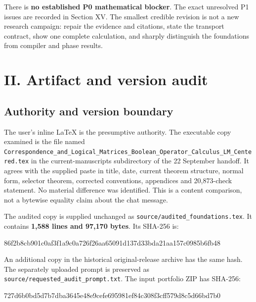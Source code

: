 \documentclass[
  10pt,
]{article}
\newenvironment{Shaded}{}{}
\newcommand{\NormalTok}[1]{#1}
\begin{document}
There is \textbf{no established P0 mathematical blocker}. The exact
unresolved P1 issues are recorded in Section XV. The smallest credible
revision is not a new research campaign: repair the evidence and
citations, state the transport contract, show one complete calculation,
and sharply distinguish the foundations from compiler and phase results.

\section{II. Artifact and version
audit}\label{ii.-artifact-and-version-audit}

\subsection{Authority and version
boundary}\label{authority-and-version-boundary}

The user's inline LaTeX is the presumptive authority. The executable
copy examined is the file named
\texttt{Correspondence\_and\_Logical\_Matrices\_Boolean\_Operator\_Calculus\_LM\_Centered.tex}
in the current-manuscripts subdirectory of the 22 September handoff. It
agrees with the supplied paste in title, date, current theorem
structure, normal form, selector theorem, corrected conventions,
appendices and 20,873-check statement. No material difference was
identified. This is a content comparison, not a bytewise equality claim
about the chat message.

The audited copy is supplied unchanged as
\texttt{source/audited\_foundations.tex}. It contains \textbf{1,588
lines and 97,170 bytes}. Its SHA-256 is:

\begin{Shaded}
\begin{Highlighting}[]
\NormalTok{86f2b8cb901c0af3f1a9c0a726f26aa65091d137d33bda21aa157c0985b6fb48}
\end{Highlighting}
\end{Shaded}

An additional copy in the historical original-release archive has the
same hash. The separately uploaded prompt is preserved as
\texttt{source/requested\_audit\_prompt.txt}. The input portfolio ZIP
has SHA-256:

\begin{Shaded}
\begin{Highlighting}[]
\NormalTok{727d6b0bd5d7b7dba3645e48e9cefe695981ef84c308f3cff579d8c5d66bd7b0}
\end{Highlighting}
\end{Shaded}
\end{document}
